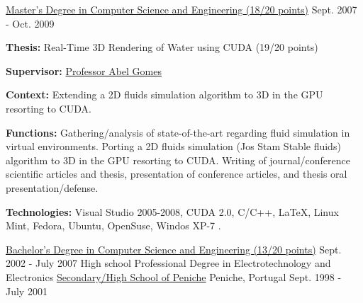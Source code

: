 \begin{cventries}
{    }
  \vspace{-0.7cm}  
  \cventry
    {\href{https://www.ubi.pt/en/course/804}{Master's Degree in Computer Science and Engineering (18/20 points)}} %
    {} %
    {} %
    {Sept. 2007 - Oct. 2009} %
    {
      \begin{cvitems} %
        \item[] {\textbf{Thesis:} Real-Time 3D Rendering of Water using CUDA (19/20 points)}
        \item[] {\textbf{Supervisor:} \href{http://www.di.ubi.pt/~agomes/}{Professor Abel Gomes}}
		\item[] {\textbf{Context:} Extending a 2D fluids simulation algorithm to 3D in the GPU resorting to CUDA.}
		\item[] {\textbf{Functions:} Gathering/analysis of state-of-the-art regarding fluid simulation in virtual environments. Porting a 2D fluids simulation (Jos Stam Stable fluids) algorithm to 3D in the GPU resorting to CUDA. Writing of journal/conference scientific articles and thesis, presentation of conference articles, and thesis oral presentation/defense.}
        \item[] {\textbf{Technologies:}  \textcolor{rainbowcolor-green}{Visual Studio 2005-2008}, \textcolor{rainbowcolor-indigo}{CUDA 2.0}, \textcolor{rainbowcolor-indigo}{C/C++}, 
\textcolor{rainbowcolor-indigo}{LaTeX}, %
\textcolor{rainbowcolor-orange}{Linux Mint}, \textcolor{rainbowcolor-orange}{Fedora}, \textcolor{rainbowcolor-orange}{Ubuntu}, \textcolor{rainbowcolor-orange}{OpenSuse}, \textcolor{rainbowcolor-orange}{Windos XP-7}       
      	.}
      \end{cvitems}
    }
  \cventry
    {\href{https://www.ubi.pt/en/course/42}{Bachelor's Degree in Computer Science and Engineering (13/20 points)}} %
    {} %
    {} %
    {Sept. 2002 - July 2007} %
    {
    }
  \vspace{-0.55cm}
  \cventry
    {High school Professional Degree in Electrotechnology and Electronics} %
    {\href{http://espeniche.pt/sitesp/index.php}{Secondary/High School of Peniche}} %
    {Peniche, Portugal} %
    {Sept. 1998 - July 2001} %
    {
    }
\end{cventries}
